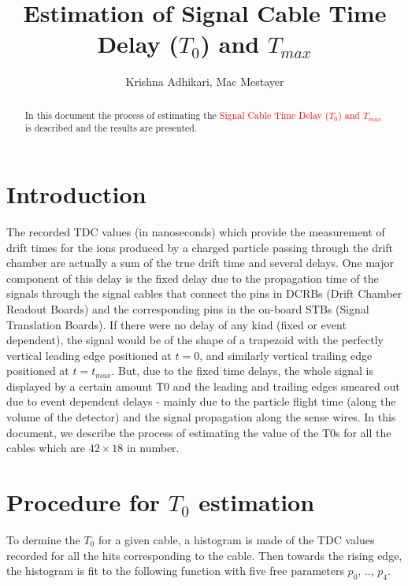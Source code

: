 \documentclass[12pt,epsfig]{article}
\def\t0{$T_0$ }
\begin{document}
\title{Estimation of Signal Cable Time Delay ($T_0$) and $T_{max}$}
\author{Krishna Adhikari, Mac Mestayer}

\maketitle

\begin{abstract}
In this document the process of estimating the \textcolor{red}{Signal Cable Time Delay ($T_0$) and $T_{max}$} 
is described and the results are presented. %
\end{abstract}

\tableofcontents

\pagebreak



\section{Introduction}
\FloatBarrier

The recorded TDC values (in nanoseconds) which provide the measurement of drift times for the ions produced by a charged particle passing through the drift chamber are actually a sum of the true drift time and several delays. One major component of this delay is the fixed delay due to the propagation time of the signals through the signal cables that connect the pins in DCRBs (Drift Chamber Readout Boards) and the corresponding pins in the on-board STBs (Signal Translation Boards). If there were no delay of any kind (fixed or event dependent), the signal would be of the shape of a trapezoid with the perfectly vertical leading edge positioned at $t = 0$, and similarly vertical trailing edge positioned at $t = t_{max}$. But, due to the fixed time delays, the whole signal is displayed by a certain amount T0 and the leading and trailing edges smeared out due to event dependent delays - mainly due to the particle flight time (along the volume of the detector) and the signal propagation along the sense wires. In this document, we describe the process of estimating the value of the T0s for all the cables which are $42\times 18$ in number.


\section{Procedure for \t0 estimation}
To dermine the $T_0$ for a given cable, a histogram is made of the TDC values recorded for all the hits corresponding to the cable. Then towards the rising edge, the histogram is fit to the following function with five free parameters $p_0$, .., $p_4$.
\end{document}
